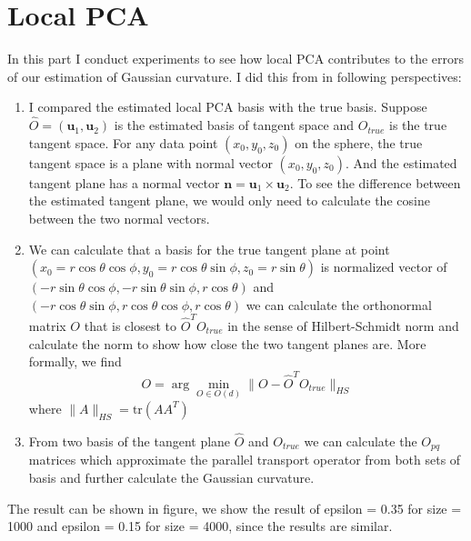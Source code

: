 \documentclass{article}
\begin{document}
\section{Local PCA}
In this part I conduct experiments to see how local PCA contributes to the errors of our estimation of Gaussian curvature. I did this from in following perspectives:
\begin{enumerate}
\item I compared the estimated local PCA basis with the true basis. Suppose $\widehat{O}=(\bm{u}_1,\bm{u}_2)$ is the estimated basis of tangent space and $O_{true}$ is the true tangent space. For any data point $(x_0,y_0,z_0)$ on the sphere, the true tangent space is a plane with normal vector $(x_0,y_0,z_0)$. And the estimated tangent plane has a normal vector $\bm{n}=\bm{u}_1\times \bm{u}_2$. To see the difference between the estimated tangent plane, we would only need to calculate the cosine between the two normal vectors. 
\item We can calculate that a basis for the true tangent plane at point $(x_0= r \cos \theta \cos \phi,y_0 = r \cos \theta \sin \phi, z_0 = r\sin \theta)$ is normalized vector of $(-r\sin \theta \cos \phi, -r \sin \theta \sin \phi, r \cos \theta)$ and $(-r \cos \theta \sin \phi, r \cos \theta \cos \phi, r \cos \theta)$ we can calculate the orthonormal matrix $O$ that is closest to $\widehat{O}^TO_{true}$ in the sense of Hilbert-Schmidt norm and calculate the norm to show how close the two tangent planes are. More formally, we find 
\begin{equation}
	O = \arg\min_{O\in O(d)}\parallel O-\widehat{O}^TO_{true} \parallel_{HS}
\end{equation}
where $\parallel A \parallel_{HS}=\text{tr}(AA^T)$
\item From two basis of the tangent plane $\widehat{O}$ and $O_{true}$ we can calculate the $O_{pq}$ matrices which approximate the parallel transport operator from both sets of basis and further calculate the Gaussian curvature. 
\end{enumerate}
The result can be shown in figure, we show the result of epsilon = 0.35 for size = 1000 and epsilon = 0.15 for size = 4000, since the results are similar.
\end{document}
